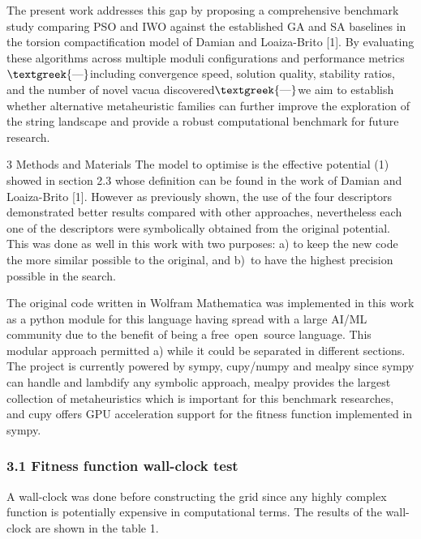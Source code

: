\documentclass{article}
\begin{document}
The present work addresses this gap by proposing a comprehensive benchmark study comparing PSO and IWO against the
established GA and SA baselines in the torsion compactification model of Damian and Loaiza-Brito [1]. By evaluating
these algorithms across multiple moduli configurations and performance metrics$\text{\textgreek{—}}$including
convergence speed, solution quality, stability ratios, and the number of novel vacua discovered$\text{\textgreek{—}}$we
aim to establish whether alternative metaheuristic families can further improve the exploration of the string landscape
and provide a robust computational benchmark for future research.

3 Methods and Materials
The model to optimise is the effective potential (1) showed in section 2.3 whose definition can be found in the work of
Damian and Loaiza-Brito [1]. However as previously shown, the use of the four descriptors demonstrated better results
compared with other approaches, nevertheless each one of the descriptors were symbolically obtained from the original
potential. This was done as well in this work with two purposes: a) to keep the new code the more similar possible to
the original, and b) to have the highest precision possible in the search.

The original code written in Wolfram Mathematica was implemented in this work as a python module for this language
having spread with a large AI/ML community due to the benefit of being a free open source language. This modular
approach permitted a) while it could be separated in different sections. The project is currently powered by sympy,
cupy/numpy and mealpy since sympy can handle and lambdify any symbolic approach, mealpy provides the largest collection
of metaheuristics which is important for this benchmark researches, and cupy offers GPU acceleration support for the
fitness function implemented in sympy.

\subsubsection[3.1 Fitness function wall{}-clock test]{3.1 Fitness function wall-clock test}
A wall-clock was done before constructing the grid since any highly complex function is potentially expensive in
computational terms. The results of the wall-clock are shown in the table 1.
\end{document}
